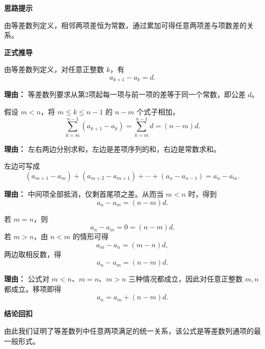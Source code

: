 \begin{proofbox}
	\textbf{\textcolor{CProof}{思路提示}}

	由等差数列定义，相邻两项差恒为常数，通过累加可得任意两项差与项数差的关系。

	\medskip
	\textbf{\textcolor{CProof}{正式推导}}
	\begin{description}[style=nextline, leftmargin=2.8em, labelsep=0.5em, itemsep=0.55em]
		\item[\textbf{步骤一（定义引入）：}] 由等差数列定义，对任意正整数 \(k\)，有
		      \[
			      a_{k+1} - a_k = d .
		      \]
		      \par\textbf{理由：} 等差数列要求从第2项起每一项与前一项的差等于同一个常数，即公差 \(d\)。

		\item[\textbf{步骤二（累加求和）：}] 假设 \(m < n\)，将 \(m \le k \le n-1\) 的 \(n-m\) 个式子相加，
		      \[
			      \sum_{k=m}^{n-1} (a_{k+1} - a_k) = \sum_{k=m}^{n-1} d = (n-m)d .
		      \]
		      \par\textbf{理由：} 左右两边分别求和，左边是差项序列的和，右边是常数求和。

		\item[\textbf{步骤三（裂项相消）：}] 左边可写成
		      \[
			      (a_{m+1}-a_m) + (a_{m+2}-a_{m+1}) + \cdots + (a_n - a_{n-1}) = a_n - a_m .
		      \]
		      \par\textbf{理由：} 中间项全部抵消，仅剩首尾项之差。从而当 \(m<n\) 时，得到
		      \[
			      a_n - a_m = (n-m)d .
		      \]

		\item[\textbf{步骤四（补全下标情形）：}] 若 \(m=n\)，则
		      \[
			      a_n-a_m=0=(n-m)d .
		      \]
		      若 \(m>n\)，由 \(n<m\) 的情形可得
		      \[
			      a_m-a_n=(m-n)d,
		      \]
		      两边取相反数，得
		      \[
			      a_n-a_m=(n-m)d .
		      \]
		      \par\textbf{理由：} 公式对 \(m<n\)、\(m=n\)、\(m>n\) 三种情况都成立，因此对任意正整数 \(m,n\) 都成立。移项即得
		      \[
			      a_n=a_m+(n-m)d .
		      \]
	\end{description}

	\medskip
	\textbf{\textcolor{CProof}{结论回扣}}

	由此我们证明了等差数列中任意两项满足的统一关系，该公式是等差数列通项的最一般形式。
\end{proofbox}